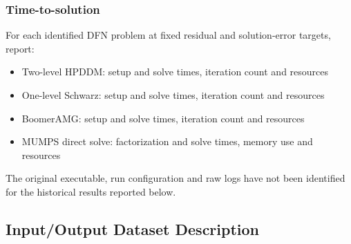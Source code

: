 \subsubsection{Time-to-solution}

For each identified DFN problem at fixed residual and solution-error targets, report:
\begin{itemize}
\item Two-level HPDDM: setup and solve times, iteration count and resources
\item One-level Schwarz: setup and solve times, iteration count and resources
\item BoomerAMG: setup and solve times, iteration count and resources
\item MUMPS direct solve: factorization and solve times, memory use and resources
\end{itemize}

The original executable, run configuration and raw logs have not been
identified for the historical results reported below.

\subsection{Input/Output Dataset Description}


